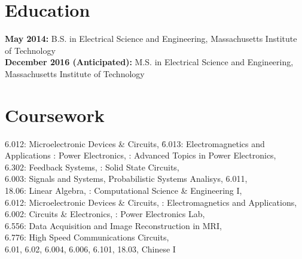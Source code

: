 \documentclass{res}
\begin{document}
 


\address{mspatz@mit.edu\\mark.h.spatz@gmail.com  }
\address{(816)-679-1502}

\begin{resume}
        
\section{Education}
\vspace{0.05in} 

{\bf May 2014:} B.S. in Electrical Science and Engineering, Massachusetts Institute of Technology\\
{\bf December 2016 (Anticipated):} M.S. in Electrical Science and Engineering, Massachusetts Institute of Technology
\section{Coursework}
	\vspace{-0.05in}
	\begin{tabbing}
	6.012: Microelectronic Devices \& Circuits, \=6.013: Electromagnetics and Applications : Power Electronics, : Advanced Topics in Power Electronics,\\
	6.302: Feedback Systems,  : Solid State Circuits,\\
	6.003: Signals and Systems,  Probabilistic Systems Analisys, 6.011,\\
	18.06: Linear Algebra, : Computational Science \& Engineering I,\\
	6.012: Microelectronic Devices \& Circuits, : Electromagnetics and Applications,\\
	6.002: Circuits \& Electronics, : Power Electronics Lab,\\
	6.556: Data Acquisition and Image Reconstruction in MRI,\\
	6.776: High Speed Communications Circuits,\\
	6.01, 6.02, 6.004, 6.006, 6.101, 18.03, Chinese I
	\end{tabbing}


\end{resume}
\end{document}
